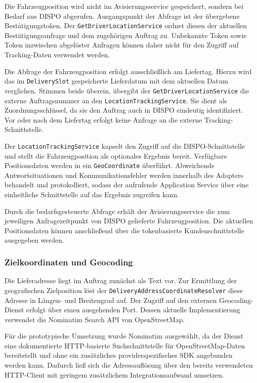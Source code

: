 Die Fahrzeugposition wird nicht im Avisierungsservice gespeichert,
sondern bei Bedarf aus DISPO abgerufen. Ausgangspunkt
der Abfrage ist der übergebene Bestätigungstoken. Der
\texttt{GetDriverLocationService} ordnet diesen der aktuellen
Bestätigungsanfrage und dem zugehörigen Auftrag zu. Unbekannte
Token sowie Token inzwischen abgelöster Anfragen können daher
nicht für den Zugriff auf Tracking-Daten verwendet werden.

Die Abfrage der Fahrzeugposition erfolgt ausschließlich am
Liefertag. Hierzu wird das im \texttt{DeliverySlot} gespeicherte
Lieferdatum mit dem aktuellen Datum verglichen. Stimmen beide
überein, übergibt der \texttt{GetDriverLocationService} die
externe Auftragsnummer an den \texttt{LocationTrackingService}.
Sie dient als Zuordnungsschlüssel, da sie den Auftrag auch in DISPO eindeutig identifiziert. Vor oder nach
dem Liefertag erfolgt keine Anfrage an die externe
Tracking-Schnittstelle.

Der \texttt{LocationTrackingService} kapselt den Zugriff auf
die DISPO-Schnittstelle und stellt die Fahrzeugposition als
optionales Ergebnis bereit. Verfügbare Positionsdaten werden in
ein \texttt{GeoCoordinate} überführt. Abweichende
Antwortsituationen und Kommunikationsfehler werden innerhalb des
Adapters behandelt und protokolliert, sodass der aufrufende
Application Service über eine einheitliche Schnittstelle auf
das Ergebnis zugreifen kann.

Durch die bedarfsgesteuerte Abfrage erhält der
Avisierungsservice die zum jeweiligen Anfragezeitpunkt von DISPO
gelieferte Fahrzeugposition. Die aktuellen Positionsdaten können
anschließend über die tokenbasierte Kundenschnittstelle
ausgegeben werden.

\subsubsection{Zielkoordinaten und Geocoding}

Die Lieferadresse liegt im Auftrag zunächst als Text vor. Zur
Ermittlung der geografischen Zielposition löst der
\texttt{Delivery\allowbreak{}Address\allowbreak{}Coordinate\allowbreak{}Resolver} diese Adresse in
Längen- und Breitengrad auf. Der Zugriff auf den externen
Geocoding-Dienst erfolgt über einen ausgehenden Port. Dessen
aktuelle Implementierung verwendet die Nominatim Search API von
OpenStreetMap.

Für die prototypische Umsetzung wurde Nominatim ausgewählt, da
der Dienst eine dokumentierte HTTP-basierte Suchschnittstelle
für OpenStreetMap-Daten bereitstellt und ohne ein zusätzliches
providerspezifisches SDK angebunden werden kann. Dadurch ließ
sich die Adressauflösung über den bereits verwendeten
HTTP-Client mit geringem zusätzlichem Integrationsaufwand
umsetzen. 

